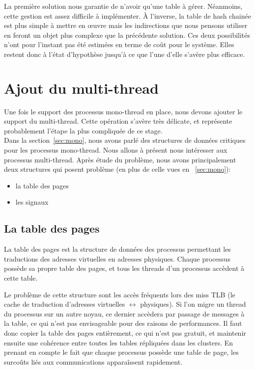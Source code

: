       La première solution nous garantie de n'avoir qu'une table à
      gérer. Néanmoins, cette gestion est assez difficile à implémenter. À
      l'inverse, la table de hash chainée est plus simple à mettre en \oe uvre
      mais les indirections que nous pensons utiliser en feront un objet plus
      complexe que la précédente solution. Ces deux possibilités n'ont pour
      l'instant pas été estimées en terme de coût pour le système. Elles restent
      donc à l'état d'hypothèse jusqu'à ce que l'une d'elle s'avère plus
      efficace.


  \section{Ajout du multi-thread}
  \label{sec:multi}  

    Une fois le support des processus mono-thread en place, nous devons ajouter
    le support du multi-thread. Cette opération s'avère très délicate, et
    représente probablement l'étape la plus compliquée de ce stage.\\

    Dans la section~\ref{sec:mono}, nous avons parlé des structures de données
    critiques pour les processus mono-thread. Nous allons à présent nous
    intéresser aux processus multi-thread. Après étude du problème, nous avons
    principalement deux structures qui posent problème (en plus de celle vues en
    ~\ref{sec:mono}):
    \begin{itemize}
      \item la table des pages
      \item les signaux
    \end{itemize}  

    \subsection{La table des pages}

      La table des pages est la structure de données des processus permettant
      les traductions des adresses virtuelles en adresses physiques. Chaque
      processus possède sa propre table des pages, et tous les threads d'un
      processus accèdent à cette table.

      Le problème de cette structure sont les accès fréquents lors des miss TLB
      (le cache de traduction d'adresses virtuelles $\leftrightarrow$
      physiques). Si l'on migre un thread du processus sur un autre noyau, ce
      dernier accèdera par passage de messages à la table, ce qui n'est pas
      envisageable pour des raisons de performances. Il faut donc copier la
      table des pages entièrement, ce qui n'est pas gratuit, et maintenir
      ensuite une cohérence entre toutes les tables répliquées dans les
      clusters. En prenant en compte le fait que chaque processus possède une
      table de page, les surcoûts liés aux communications apparaîssent
      rapidement.

